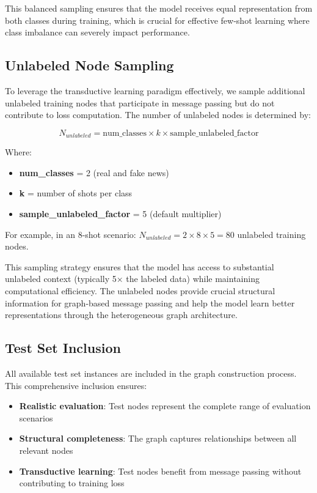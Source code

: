 This balanced sampling ensures that the model receives equal representation from both classes during training, which is crucial for effective few-shot learning where class imbalance can severely impact performance.

\subsection{Unlabeled Node Sampling}

To leverage the transductive learning paradigm effectively, we sample additional unlabeled training nodes that participate in message passing but do not contribute to loss computation. The number of unlabeled nodes is determined by:

\begin{equation}
N_{unlabeled} = \text{num\_classes} \times k \times \text{sample\_unlabeled\_factor}
\end{equation}

Where:
\begin{itemize}
    \item \textbf{num\_classes} = 2 (real and fake news)
    \item \textbf{k} = number of shots per class  
    \item \textbf{sample\_unlabeled\_factor} = 5 (default multiplier)
\end{itemize}

For example, in an 8-shot scenario: $N_{unlabeled} = 2 \times 8 \times 5 = 80$ unlabeled training nodes.

This sampling strategy ensures that the model has access to substantial unlabeled context (typically 5× the labeled data) while maintaining computational efficiency. The unlabeled nodes provide crucial structural information for graph-based message passing and help the model learn better representations through the heterogeneous graph architecture.

\subsection{Test Set Inclusion}

All available test set instances are included in the graph construction process. This comprehensive inclusion ensures:
\begin{itemize}
    \item \textbf{Realistic evaluation}: Test nodes represent the complete range of evaluation scenarios
    \item \textbf{Structural completeness}: The graph captures relationships between all relevant nodes
    \item \textbf{Transductive learning}: Test nodes benefit from message passing without contributing to training loss
\end{itemize}

